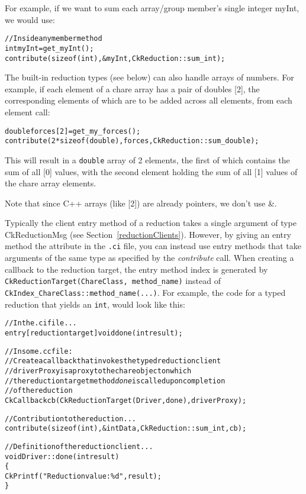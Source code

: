 For example, if we want to sum each array/group member's single integer myInt, 
we would use:

\begin{alltt}
    // Inside any member method
    int myInt=get_myInt();
    contribute(sizeof(int),\&myInt,CkReduction::sum_int);
\end{alltt}

The built-in reduction types (see below) can also handle arrays of
numbers.  For example, if each element of a chare array has a pair of
doubles [2], the corresponding elements of which are to be added across
all elements, from each element call:

\begin{alltt}
    double forces[2]=get_my_forces();
    contribute(2*sizeof(double),forces,CkReduction::sum_double);
\end{alltt}

This will result in a {\tt double} array of 2 elements, the first of which
contains the sum of all [0] values, with the second element 
holding the sum of all [1] values of the chare array elements.

Note that since C++ arrays (like [2]) are already pointers, we 
don't use \&.


Typically the client entry method of a reduction takes a single argument of
type CkReductionMsg (see Section~\ref{reductionClients}). However, by giving an entry method the
 attribute in the {\tt .ci} file, you can instead use entry methods that take
arguments of the same type as specified by the {\em contribute} call.  
When creating a callback to the
reduction target, the entry method index is generated by 
{\tt CkReductionTarget(ChareClass, method\_name)} 
instead of {\tt CkIndex\_ChareClass::method\_name(...)}.
For example,
the code for a typed reduction that yields an {\tt int}, would look like this:

\begin{alltt}
  // In the .ci file...
  entry [reductiontarget] void done(int result);

  // In some .cc file: 
  // Create a callback that invokes the typed reduction client
  // driverProxy is a proxy to the chare object on which 
  // the reduction target method {\em done} is called upon completion 
  // of the reduction
  CkCallback cb(CkReductionTarget(Driver, done), driverProxy);

  // Contribution to the reduction...
  contribute(sizeof(int), &intData, CkReduction::sum_int, cb);

  // Definition of the reduction client...
  void Driver::done(int result) 
  \{
    CkPrintf("Reduction value: \%d", result);
  \}
\end{alltt}

